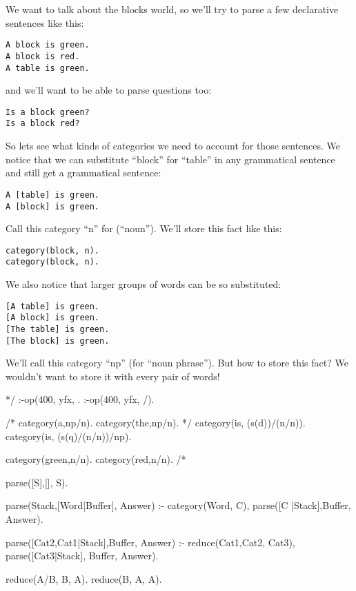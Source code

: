 \documentclass{book}[9pt]
\newenvironment{code}%
{\small \verbatim}%
{\endverbatim \large}
\begin{document}
We want to talk about the blocks world, so we'll try to parse a few
declarative sentences like this:

\begin{verbatim}
A block is green.
A block is red.
A table is green.
\end{verbatim}
\noindent and we'll want to be able to parse questions too:
\begin{verbatim}
Is a block green?
Is a block red?
\end{verbatim}

So lets see what kinds of categories we need to account for those sentences.
We notice that we can substitute ``block'' for ``table'' in any grammatical
sentence and still get a grammatical sentence:
\begin{verbatim}
A [table] is green.
A [block] is green.
\end{verbatim}
\noindent Call this category ``n'' for (``noun'').  We'll store
this fact like this:
\begin{verbatim}
category(block, n).
category(block, n).
\end{verbatim}

\noindent We also notice that larger groups of words can be so substituted:
\begin{verbatim}
[A table] is green.
[A block] is green.
[The table] is green.
[The block] is green.
\end{verbatim}
\noindent We'll call this category ``np'' (for ``noun phrase'').  But
how to store this fact?  We wouldn't want to store it with every pair 
of words!  

\begin{code}
*/
:-op(400, yfx, \).
:-op(400, yfx, /).

/*
category(a,np/n).
category(the,np/n).
*/
category(is, (s(d)\np)/(n/n)).
category(is, (s(q)/(n/n))/np).

category(green,n/n).
category(red,n/n).
/*
\end{code}


\begin{code}
parse([S],[], S).

parse(Stack,[Word|Buffer],  Answer) :-
        category(Word, C),
        parse([C |Stack],Buffer, Answer).

parse([Cat2,Cat1|Stack],Buffer, Answer) :-
        reduce(Cat1,Cat2, Cat3),
        parse([Cat3|Stack], Buffer, Answer).

reduce(A/B,    B,      A).
reduce(B,      A\B,    A).
\end{code}
\end{document}
